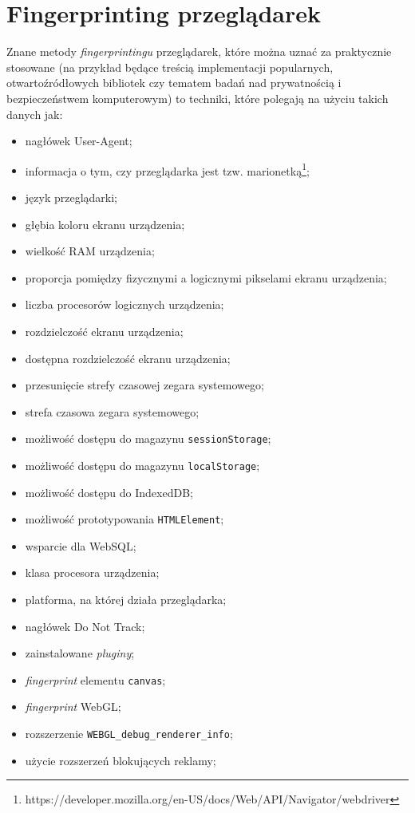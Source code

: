 \section{Fingerprinting przeglądarek}
Znane metody \emph{fingerprintingu} przeglądarek, które można uznać za
praktycznie stosowane (na przykład będące treścią implementacji popularnych,
otwartoźródłowych bibliotek czy tematem badań nad prywatnością i bezpieczeństwem
komputerowym) to techniki, które polegają na użyciu takich danych jak:
\begin{itemize}
	\item nagłówek User-Agent;
	\item informacja o tym, czy przeglądarka jest tzw. marionetką\footnote{https://developer.mozilla.org/en-US/docs/Web/API/Navigator/webdriver};
	\item język przeglądarki;
	\item głębia koloru ekranu urządzenia;
	\item wielkość RAM urządzenia;
	\item proporcja pomiędzy fizycznymi a logicznymi pikselami ekranu urządzenia;
	\item liczba procesorów logicznych urządzenia;
	\item rozdzielczość ekranu urządzenia;
	\item dostępna rozdzielczość ekranu urządzenia;
	\item przesunięcie strefy czasowej zegara systemowego;
	\item strefa czasowa zegara systemowego;
	\item możliwość dostępu do magazynu \texttt{sessionStorage};
	\item możliwość dostępu do magazynu \texttt{localStorage};
	\item możliwość dostępu do IndexedDB;
	\item możliwość prototypowania \texttt{HTMLElement};
	\item wsparcie dla WebSQL;
	\item klasa procesora urządzenia;
	\item platforma, na której działa przeglądarka;
	\item nagłówek Do Not Track;
	\item zainstalowane \emph{pluginy};
	\item \emph{fingerprint} elementu \texttt{canvas};
	\item \emph{fingerprint} WebGL;
	\item rozszerzenie \texttt{WEBGL\_debug\_renderer\_info};
	\item użycie rozszerzeń blokujących reklamy;

\end{itemize}
